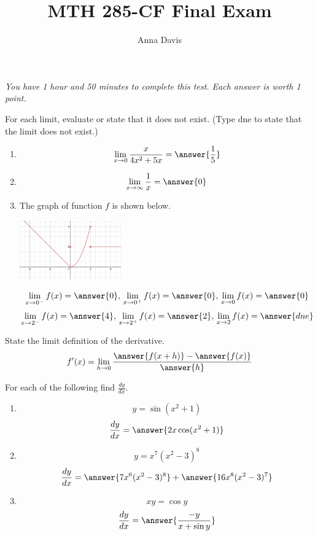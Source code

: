 \documentclass{ximera}
\author{Anna Davis} \title{MTH 285-CF Final Exam}
\begin{document}
\begin{abstract}

\end{abstract}
\maketitle
 \textit{You have 1 hour and 50 minutes to complete this test.  Each answer is worth 1 point.}
\begin{problem}\label{prob:mth240finalprob1}
For each limit, evaluate or state that it does not exist.  (Type dne to state that the limit does not exist.)
  \begin{enumerate}
\item
$$\lim_{x\rightarrow 0} \frac{x}{4x^2+5x}=\answer{\frac{1}{5}}$$

\item
$$\lim_{x\rightarrow \infty} \frac{1}{x}=\answer{0}$$
\item The graph of function $f$ is shown below.
\begin{image}
   
\includegraphics[height=1in]{240finalimage1.jpg}

\end{image}

$$\lim_{x\rightarrow 0^-}f(x)=\answer{0},\,\lim_{x\rightarrow 0^+}f(x)=\answer{0},\,\lim_{x\rightarrow 0}f(x)=\answer{0}$$
$$\lim_{x\rightarrow 2^-}f(x)=\answer{4},\,\lim_{x\rightarrow 2^+}f(x)=\answer{2},\,\lim_{x\rightarrow 2}f(x)=\answer{dne}$$

  \end{enumerate}
\end{problem}

\begin{problem}\label{prob:mth240finalprob2}
State the limit definition of the derivative.
$$f'(x)=\lim_{h\rightarrow 0}\frac{\answer{f(x+h)}-\answer{f(x)}}{\answer{h}}$$
\end{problem}

\begin{problem}\label{prob:mth240finalprob3}
For each of the following find $\frac{dy}{dx}$.
  \begin{enumerate}
\item
$$y=\sin (x^2+1)$$
$$\frac{dy}{dx}=\answer{2x\cos(x^2+1)}$$

\item
$$y=x^7(x^2-3)^8$$
$$\frac{dy}{dx}=\answer{7x^6(x^2-3)^8}+\answer{16x^8(x^2-3)^7}$$

\item
$$xy=\cos y$$
$$\frac{dy}{dx}=\answer{\frac{-y}{x+\sin y}}$$
  \end{enumerate}
\end{problem}
\end{document}

